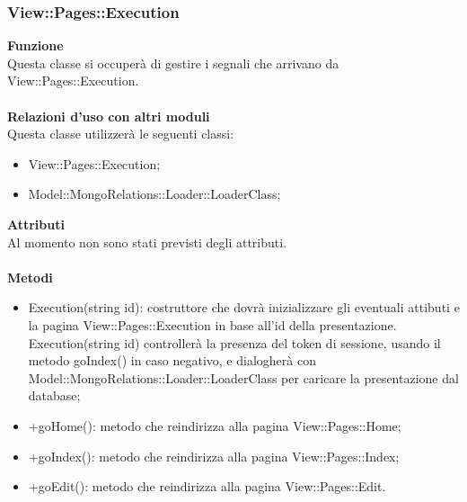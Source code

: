 {				\subsubsection{View::Pages::Execution}{
					\textbf{Funzione}\\
					\indent Questa classe si occuperà di gestire i segnali che arrivano da View::Pages::Execution.\\\\
					\textbf{Relazioni d'uso con altri moduli}\\
					\indent Questa classe utilizzerà le seguenti classi:
					\begin{itemize}
						\item View::Pages::Execution;
						\item Model::MongoRelations::Loader::LoaderClass;
					\end{itemize}
					\textbf{Attributi}\\
					\indent Al momento non sono stati previsti degli attributi.\\\\
					\textbf{Metodi}
					\begin{itemize}
						\item Execution(string id): costruttore che dovrà inizializzare gli eventuali attibuti e la pagina View::Pages::Execution in base all'id della presentazione. Execution(string id) controllerà la presenza del token di sessione, usando il metodo goIndex() in caso negativo, e dialogherà con Model::MongoRelations::Loader::LoaderClass per caricare la presentazione dal database;
						\item +goHome(): metodo che reindirizza alla pagina View::Pages::Home;
						\item +goIndex(): metodo che reindirizza alla pagina View::Pages::Index;
						\item +goEdit(): metodo che reindirizza alla pagina View::Pages::Edit.
					\end{itemize}
				}
}
